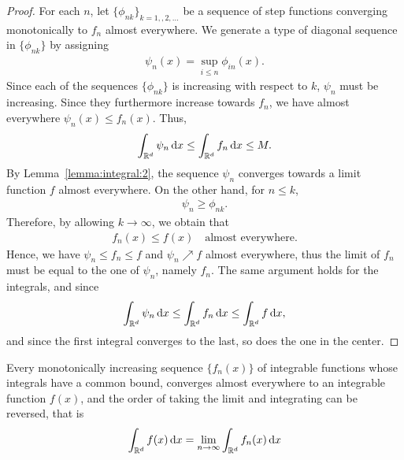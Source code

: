 \begin{proof}
  For each $n$, let $\{\phi_{nk}\}_{k=1,,2,\dots}$ be a sequence of
  step functions converging monotonically to $f_n$ almost
  everywhere. We generate a type of diagonal sequence in
  $\{\phi_{nk}\}$ by assigning
  \begin{gather*}
    \psi_n(x) = \sup_{i\le n} \phi_{in}(x).
  \end{gather*}
  Since each of the sequences $\{\phi_{nk}\}$ is increasing with
  respect to $k$, $\psi_n$ must be increasing. Since they furthermore
  increase towards $f_n$, we have almost everywhere $\psi_n(x) \le
  f_n(x)$. Thus, 
  \begin{gather*}
    \int_{\mathbb R^d} \psi_n \,\mathrm{d} x \le \int_{\mathbb R^d} f_n\,\mathrm{d} x \le M.
  \end{gather*}
  By Lemma~\ref{lemma:integral:2}, the sequence $\psi_n$ converges
  towards a limit function $f$ almost everywhere. On the other
  hand, for $n\le k$,
  \begin{gather*}
    \psi_n \ge \phi_{nk}.
  \end{gather*}
  Therefore, by allowing $k\to\infty$, we obtain that
  \begin{gather*}
    f_n(x) \le f(x) \quad\text{almost everywhere}.
  \end{gather*}
  Hence, we have $\psi_n \le f_n \le f$ and $\psi_n \nearrow f$ almost
  everywhere, thus the limit of $f_n$ must be equal to the one of
  $\psi_n$, namely $f_n$. The same argument holds for the integrals,
  and since
  \begin{gather*}
    \int_{\mathbb R^d} \psi_n \,\mathrm{d} x \le \int_{\mathbb R^d} f_n \,\mathrm{d} x \le \int_{\mathbb R^d} f \,\mathrm{d} x,
  \end{gather*}
  and since the first integral converges to the last, so does the one
  in the center.
\end{proof}

\begin{theorem}
  \label{theorem:Beppo-Levi}
  Every monotonically increasing sequence $\{f_n(x)\}$
  of integrable functions whose
  integrals have a common bound, converges almost everywhere to an
  integrable function $f(x)$, and the order of taking the limit and
  integrating can be reversed, that is
  \begin{gather}
    \int_{\mathbb R^d} f(x)\,\mathrm{d} x
    = \lim_{n\to\infty} \int_{\mathbb R^d} f_n(x)\,\mathrm{d} x
  \end{gather}
\end{theorem}

